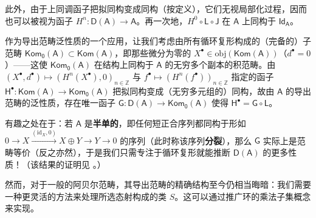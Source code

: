 此外，由于上同调函子把拟同构变成同构（按定义），它们无视局部化过程，因而也可以被视为函子 $H^n:\mathsf{D(A)}\rightarrow\mathsf{A}$。再一次地，$H^0\circ\mathsf{L}\circ\mathsf{J}$ 在 $\mathsf{A}$ 上同构于 $\mathsf{Id_A}$。

\begin{Rem}\label{semisimple}
	作为导出范畴泛性质的一个应用，让我们考虑由所有循环复形构成的（完备的）子范畴 $\mathsf{Kom_0(A)}\subset\mathsf{Kom(A)}$，即那些微分为零的 $X^\bullet\in\text{obj}(\mathsf{Kom(A)})$（$d^\bullet=0$）——这使 $\mathsf{Kom_0(A)}$ 在结构上同构于 $\mathsf{A}$ 的无穷多个副本的积范畴。由 $(X^\bullet,d^\bullet)\mapsto(H^n(X^\bullet),0)_{n\in\mathbb{Z}}$ 与 $f^\bullet\mapsto (H^n(f^\bullet))_{n\in\mathbb{Z}}$ 指定的函子 $\mathsf{H}^\bullet:\mathsf{Kom(A)}\rightarrow\mathsf{Kom_0(A)}$ 把拟同构变成（无穷多元组的）同构，故由 $\mathsf{A}$ 的导出范畴的泛性质，存在唯一函子 $\mathsf{G}:\mathsf{D(A)}\rightarrow\mathsf{Kom_0(A)}$ 使得 $\mathsf{H}^\bullet=\mathsf{G}\circ\mathsf{L}$。
	
	有趣之处在于：若 $\mathsf{A}$ 是\textbf{半单的}，即任何短正合序列都同构于形如 $0\rightarrow X\xrightarrow{(\text{id}_X,0)} X\oplus Y\rightarrow Y\rightarrow 0$ 的序列（此时称该序列\textbf{分裂}），那么 $\mathsf{G}$ 实际上是范畴等价（反之亦然），于是我们只需专注于循环复形就能推断 $\mathsf{D(A)}$ 的更多性质！（该结果的证明见 \cite[Proposition III.2.4]{[GM03]}。）
\end{Rem}


然而，对于一般的阿贝尔范畴，其导出范畴的精确结构至今仍相当晦暗：我们需要一种更灵活的方法来处理所选态射构成的类 $S$。这可以通过推广环的乘法子集概念来实现。

